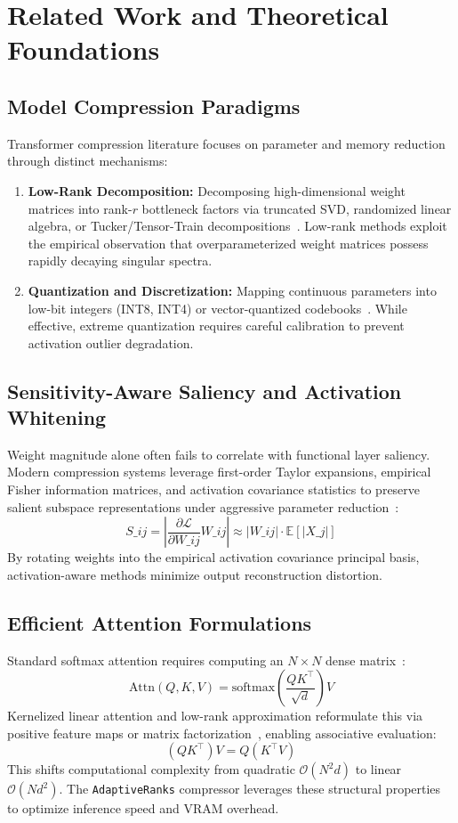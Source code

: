 \section{Related Work and Theoretical Foundations}

\subsection{Model Compression Paradigms}
Transformer compression literature focuses on parameter and memory reduction through distinct mechanisms:
\begin{enumerate}
\item \textbf{Low-Rank Decomposition:} Decomposing high-dimensional weight matrices into rank-$r$ bottleneck factors via truncated SVD, randomized linear algebra, or Tucker/Tensor-Train decompositions~\citep{eckart1936,halko2011,wang2024svdllm,yuan2023asvd,hsu2022fwsvd,chen2021drone,lan2020albert,novikov2015tensor}. Low-rank methods exploit the empirical observation that overparameterized weight matrices possess rapidly decaying singular spectra.
\item \textbf{Quantization and Discretization:} Mapping continuous parameters into low-bit integers (INT8, INT4) or vector-quantized codebooks~\citep{frantar2023gptq,lin2024awq,xiao2023smoothquant}. While effective, extreme quantization requires careful calibration to prevent activation outlier degradation.
\end{enumerate}

\subsection{Sensitivity-Aware Saliency and Activation Whitening}
Weight magnitude alone often fails to correlate with functional layer saliency. Modern compression systems leverage first-order Taylor expansions, empirical Fisher information matrices, and activation covariance statistics to preserve salient subspace representations under aggressive parameter reduction~\citep{kirkpatrick2017,molchanov2019}:
\[
S\_{ij} = \left| \frac{\partial \mathcal{L}}{\partial W\_{ij}} W\_{ij} \right| \approx |W\_{ij}| \cdot \mathbb{E}[|X\_j|]
\]
By rotating weights into the empirical activation covariance principal basis, activation-aware methods minimize output reconstruction distortion.

\subsection{Efficient Attention Formulations}
Standard softmax attention requires computing an $N \times N$ dense matrix~\citep{vaswani2017}:
\[
\text{Attn}(Q, K, V) = \text{softmax}\left(\frac{Q K^\top}{\sqrt{d}}\right) V
\]
Kernelized linear attention and low-rank approximation reformulate this via positive feature maps or matrix factorization~\citep{katharopoulos2020,choromanski2021,xiong2021nystromformer}, enabling associative evaluation:
\[
(Q K^\top) V = Q (K^\top V)
\]
This shifts computational complexity from quadratic $\mathcal{O}(N^2 d)$ to linear $\mathcal{O}(N d^2)$. The \texttt{AdaptiveRanks} compressor leverages these structural properties to optimize inference speed and VRAM overhead.
